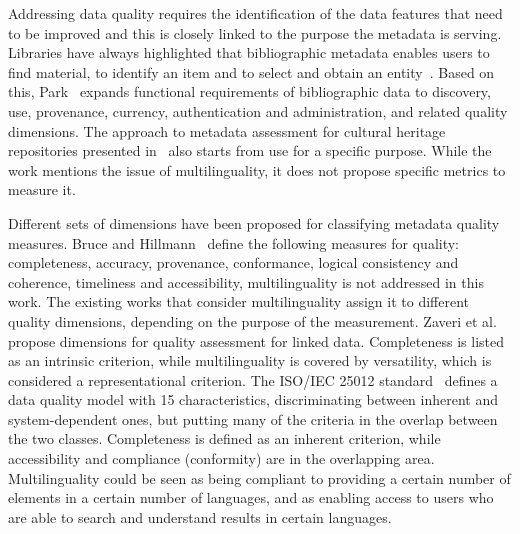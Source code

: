 Addressing data quality requires the identification of the data features that need to be improved and this is closely linked to the purpose the metadata is serving. Libraries have always highlighted that bibliographic metadata enables users to find material, to identify an item and to select and obtain an entity~\cite{frbr1998}. Based on this, Park~\cite{park2009} expands functional requirements of bibliographic data to discovery, use, provenance, currency, authentication and administration, and related quality dimensions. The approach to metadata assessment for cultural heritage repositories presented in~\cite{bellini2013} also starts from use for a specific purpose. While the work mentions the issue of multilinguality, it does not propose specific metrics to measure it.

Different sets of dimensions have been proposed for classifying metadata quality measures. Bruce and Hillmann~\cite{bruce-hillmann2004} define the following measures for quality: completeness, accuracy, provenance, conformance, logical consistency and coherence, timeliness and accessibility,
multilinguality is not addressed in this work. %
The existing works that consider multilinguality assign it to different quality dimensions, depending on the purpose of the measurement. Zaveri et al.~\cite{zaveri2015} propose dimensions for quality assessment for linked data.
Completeness is listed as an intrinsic criterion, while multilinguality is covered by versatility, which is considered a representational criterion. The ISO/IEC 25012 standard~\cite{iso25012} defines a data quality model with 15 characteristics, discriminating between inherent and system-dependent ones, but putting many of the criteria in the overlap between the two classes. Completeness is defined as an inherent criterion, while accessibility and compliance (conformity) are in the overlapping area. Multilinguality could be seen as being compliant to providing a certain number of elements in a certain number of languages, and as enabling access to users who are able to search and understand results in certain languages.
